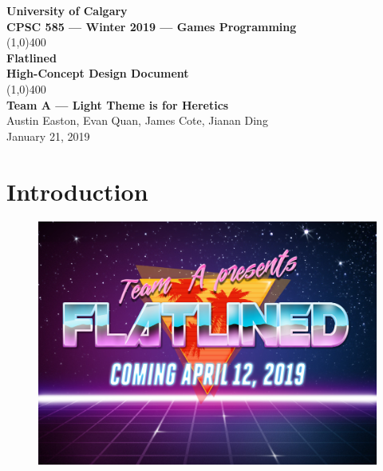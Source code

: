 \documentclass{article}
\newcommand{\name}{Flatlined}
\newcommand{\team}{Team A --- Light Theme is for Heretics}
\theoremstyle{definition}
\begin{document}
\begin{titlepage}
  \begin{center}
    \vspace*{1cm}
    \Large{\textbf{University of Calgary}}\\
    \Large{\textbf{CPSC 585 --- Winter 2019 --- Games Programming}}\\
    \vfill
    \line(1,0){400}\\[1mm]
    \huge{\textbf{\name{}}}\\
    \large{\textbf{High-Concept Design Document}}\\
    \line(1,0){400}\\
    \vfill
    \Large{\textbf{\team{}}}\\
    \Large{Austin Easton, Evan Quan, James Cote, Jianan Ding}\\
    \large{January 21, 2019}
  \end{center}
\end{titlepage}
\setcounter{page}{0}
\tableofcontents
{}
\break{}

\section{Introduction}

\begin{figure}[htpb]
  \centering
  \includegraphics[width=1.0\linewidth]{title_art.jpg}
\label{fig:title_art}
\end{figure}
\end{document}
